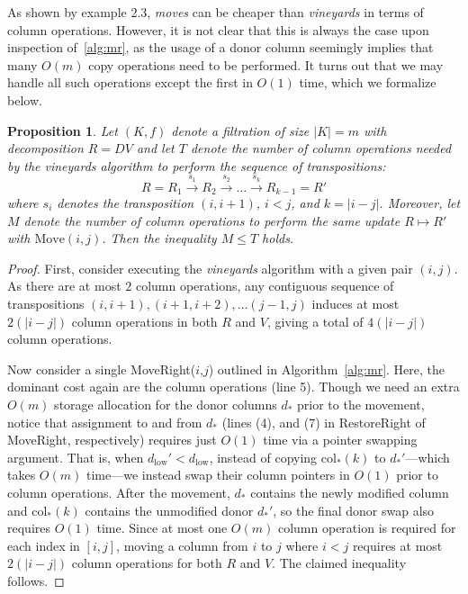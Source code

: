 \documentclass[sn-mathphys]{sn-jnl}
\newtheorem{proposition}{Proposition}
\begin{document}
As shown by example 2.3, \emph{moves} can be cheaper than \emph{vineyards} in terms of column operations. However, it is not clear that this is always the case upon inspection of~\ref{alg:mr}, as the usage of a donor column seemingly implies that many $O(m)$ copy operations need to be performed. 
It turns out that we may handle all such operations except the first in $O(1)$ time, which we formalize below.
\begin{proposition}\label{prop:factor2}
	Let $(K,f)$ denote a filtration of size $\lvert K \rvert = m$ with decomposition $R = D V$ and let $T$ denote the number of column operations needed by the vineyards algorithm to perform the sequence of transpositions:
	$$ R = R_1 \overset{s_1}{\to} R_2 \overset{s_2}{\to} \dots \overset{s_k}{\to} R_{k-1} = R' $$
	where $s_i$ denotes the transposition $(i,i+1)$, $i < j$, and $k = \lvert i - j\rvert$. Moreover, let $M$ denote the number of column operations to perform the same update $R \mapsto R'$ with $\mathrm{Move}(i,j)$. Then the inequality $M \leq T$ holds.
\end{proposition}
\begin{proof} \normalsize
First, consider executing the \emph{vineyards} algorithm with a given pair $(i, j)$. As there are at most $2$ column operations, any contiguous sequence of transpositions $(i,i+1), (i+1,i+2), \ldots (j-1,j)$ induces at most $2(\lvert i - j \rvert)$ column operations in both $R$ and $V$, giving a total of $4(\lvert i - j \rvert)$ column operations.

Now consider a single MoveRight($i$,$j$) outlined in Algorithm~\ref{alg:mr}. Here, the dominant cost again are the column operations (line 5). 
Though we need an extra $O(m)$ storage allocation for the donor columns $d_\ast$ prior to the movement, notice that assignment to and from $d_\ast$ (lines (4), and (7) in RestoreRight of MoveRight, respectively) requires just $O(1)$ time via a pointer swapping argument. That is, when $d_\mathrm{low}' < d_\mathrm{low}$, instead of copying $\mathrm{col}_\ast(k)$ to $d_\ast'$---which takes $O(m)$ time---we instead swap their column pointers in $O(1)$   prior to column operations. After the movement, $d_\ast$ contains the newly modified column and $\mathrm{col}_\ast(k)$ contains the unmodified donor $d_\ast'$, so the final donor swap also requires $O(1)$ time. 
Since at most one $O(m)$ column operation is required for each index in $[i, j]$, moving a column from $i$ to $j$ where $i < j$ requires at most $2(\lvert i - j \rvert)$ column operations for both $R$ and $V$. The claimed inequality follows. 
\end{proof}
\end{document}
